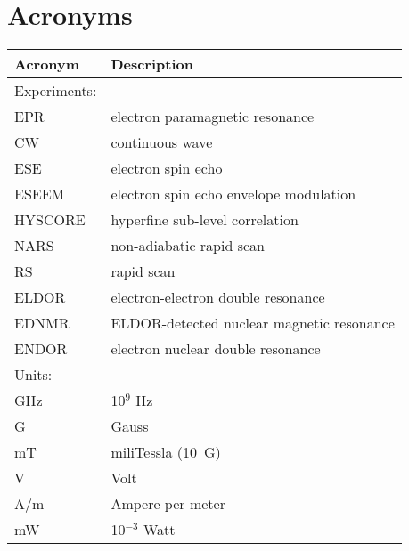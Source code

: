 \documentclass[11pt,DIV=14,a4paper,openany,twoside=semi,english,titlepage=true,BCOR=1cm]{scrbook}
\begin{document}
\newpage
\makeatletter
\renewcommand{\@pnumwidth}{1.75em} 
\renewcommand{\@tocrmarg}{2em}
\makeatother
\tableofcontents\newpage

\listoffigures\newpage

\listoftables\newpage

\newpage
\chapter*{Acronyms}
\begin{table}[ht!]
\small
{}
\begin{tabular}{ll}
\textbf{Acronym}     & \textbf{Description} \\ \hline \hline
\rowcolor{LightCyan}
Experiments:    & \\ \hline
EPR             & electron paramagnetic resonance \\
CW              & continuous wave \\
ESE             & electron spin echo \\
ESEEM           & electron spin echo envelope modulation \\
HYSCORE         & hyperfine sub-level correlation \\
NARS            & non-adiabatic rapid scan \\
RS              & rapid scan \\
ELDOR           & electron-electron double resonance \\
EDNMR           & ELDOR-detected nuclear magnetic resonance \\
ENDOR           & electron nuclear double resonance \\ \hline \hline
\rowcolor{LightCyan}
Units:          & \\ \hline
GHz             & 10$^9$ Hz \\
G               & Gauss \\
mT              & miliTessla (10~G) \\
V               & Volt \\
A/m             & Ampere per meter \\
mW              & 10$^{-3}$ Watt \\ \hline \hline

\end{tabular}
\end{table}
\end{document}
